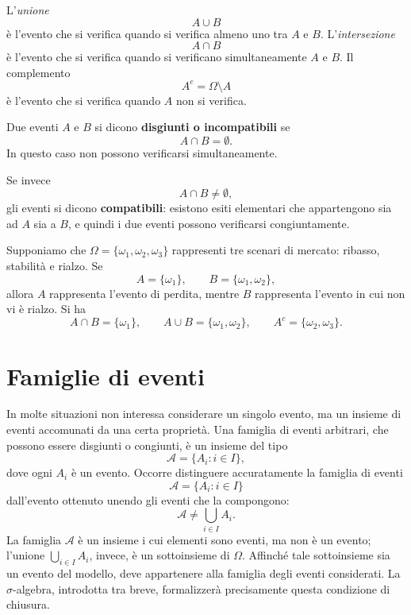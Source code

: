 L'\textit{unione}
\[
A\cup B
\]
\`{e} l'evento che si verifica quando si verifica almeno uno tra $A$ e $B$.
L'\textit{intersezione}
\[
A\cap B
\]
\`{e} l'evento che si verifica quando si verificano simultaneamente $A$ e $B$.
Il complemento
\[
A^{c}=\Omega\setminus A
\]
\`{e} l'evento che si verifica quando $A$ non si verifica.

Due eventi $A$ e $B$ si dicono \textbf{disgiunti o incompatibili} se
\[
A\cap B=\emptyset.
\]
In questo caso non possono verificarsi simultaneamente. 

Se invece
\[
A\cap B\neq\emptyset,
\]
gli eventi si dicono \textbf{compatibili}: esistono esiti elementari che appartengono
sia ad $A$ sia a $B$, e quindi i due eventi possono verificarsi congiuntamente.

\begin{example}
Supponiamo che $\Omega=\{\omega_{1},\omega_{2},\omega_{3}\}$ rappresenti tre
scenari di mercato: ribasso, stabilit\`{a} e rialzo. Se
\[
A=\{\omega_{1}\},\qquad B=\{\omega_{1},\omega_{2}\},
\]
allora $A$ rappresenta l'evento di perdita, mentre $B$ rappresenta l'evento in
cui non vi \`{e} rialzo. Si ha
\[
A\cap B=\{\omega_{1}\},\qquad A\cup B=\{\omega_{1},\omega_{2}\},\qquad
A^{c}=\{\omega_{2},\omega_{3}\}.
\]

\end{example}

\section{Famiglie di eventi}
In molte situazioni non interessa considerare un singolo evento, ma un insieme di eventi accomunati da una certa propriet\`{a}. 
Una famiglia di eventi arbitrari, che possono essere disgiunti o congiunti, \`{e} un insieme del tipo
\[
\mathcal{A}=\{A_i:i\in I\},
\]
dove ogni \(A_i\) \`{e} un evento.
Occorre distinguere accuratamente la famiglia di eventi
\[
\mathcal{A}=\{A_i:i\in I\}
\]
dall'evento ottenuto unendo gli eventi che la compongono:
\[
\mathcal{A}\neq \bigcup_{i\in I}A_i.
\]
La famiglia \(\mathcal{A}\) \`{e} un insieme i cui elementi sono eventi, ma non
\`{e} un evento; l'unione \(\bigcup_{i\in I}A_i\), invece, \`{e} un
sottoinsieme di \(\Omega\). Affinch\'{e} tale sottoinsieme sia un evento del
modello, deve appartenere alla famiglia degli eventi considerati. La
$\sigma$-algebra, introdotta tra breve, formalizzer\`{a} precisamente questa
condizione di chiusura.



